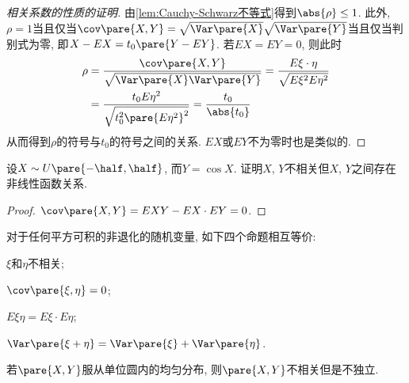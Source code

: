 \documentclass[../Statistics.tex]{subfiles}
\begin{document}
\begin{proof}[相关系数的性质的证明]
    由\cref{lem:Cauchy-Schwarz不等式}得到$\abs{\rho}\le 1$. 此外, $\rho = 1$当且仅当$\cov\pare{X,Y} = \sqrt{\Var\pare{X}}\sqrt{\Var\pare{Y}}$当且仅当判别式为零, 即$X-EX = t_0 \pare{Y-EY}$. 若$EX=EY= 0$, 则此时
    \begin{align*}
        \rho &= \frac{\cov\pare{X,Y}}{\sqrt{\Var\pare{X}\Var\pare{Y}}} = \frac{E\xi\cdot\eta}{\sqrt{E\xi^2 E\eta^2}} \\
        &= \frac{t_0 E\eta^2}{\sqrt{t_0^2\pare{E\eta^2}^2}} = \frac{t_0}{\abs{t_0}}
    \end{align*}
    从而得到$\rho$的符号与$t_0$的符号之间的关系. $EX$或$EY$不为零时也是类似的.
\end{proof}
\begin{sample}
    \begin{ex}
        设$X \sim \displaystyle U\pare{-\half, \half}$, 而$Y = \cos X$. 证明$X$, $Y$不相关但$X$, $Y$之间存在非线性函数关系.
    \end{ex}
    \begin{proof}
        $\displaystyle \cov\pare{X,Y} = EXY - EX\cdot EY = 0$.
    \end{proof}
\end{sample}
\begin{theorem}
    对于任何平方可积的非退化的随机变量, 如下四个命题相互等价:
    \begin{cenum}
        \item $\xi$和$\eta$不相关;
        \item $\cov\pare{\xi,\eta} = 0$;
        \item $E\xi \eta = E\xi \cdot E\eta$;
        \item $\Var\pare{\xi + \eta}  = \Var\pare{\xi} + \Var\pare{\eta}$.
    \end{cenum}
\end{theorem}
\begin{sample}
    \begin{ex}
        若$\pare{X,Y}$服从单位圆内的均匀分布, 则$\pare{X,Y}$不相关但是不独立.
    \end{ex}
\end{sample}
\end{document}
